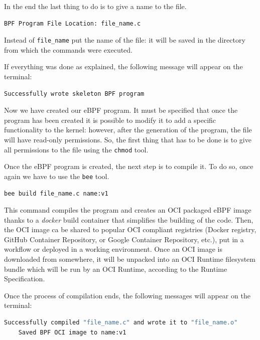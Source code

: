 In the end the last thing to do is to give a name to the file.

\begin{lstlisting}[language=bash, caption={bee file location}]
	BPF Program File Location: file_name.c
\end{lstlisting}

Instead of \verb|file_name| put the name of the file: it will be saved in the directory from which the commands were executed.

If everything was done as explained, the following message will appear on the terminal:

\begin{lstlisting}[language=bash, caption={bee successful program creation message}]
	Successfully wrote skeleton BPF program
\end{lstlisting}

Now we have created our eBPF program.
It must be specified that once the program has been created it is possible to modify it to add a specific functionality to the kernel: however, after the generation of the program, the file will have read-only permissions.
So, the first thing that has to be done is to give all permissions to the file using the \verb|chmod| tool.

Once the eBPF program is created, the next step is to compile it.
To do so, once again we have to use the \verb|bee| tool.

\begin{lstlisting}[language=bash, caption={bee built command}]
	bee build file_name.c name:v1
\end{lstlisting}

This command compiles the program and creates an OCI packaged eBPF image thanks to a \textit{docker} build container that simplifies the building of the code.
Then, the OCI image ca be shared to popular OCI compliant registries (Docker registry, GitHub Container Repository, or Google Container Repository, etc.), put in a workflow or deployed in a working environment.
Once an OCI image is downloaded from somewhere, it will be unpacked into an OCI Runtime filesystem bundle which will be run by an OCI Runtime, according to the Runtime Specification.

Once the process of compilation ends, the following messages will appear on the terminal: 

\begin{lstlisting}[language=bash, caption={bee successful OCI creation messages}]
	Successfully compiled "file_name.c" and wrote it to "file_name.o"
	Saved BPF OCI image to name:v1
\end{lstlisting}

